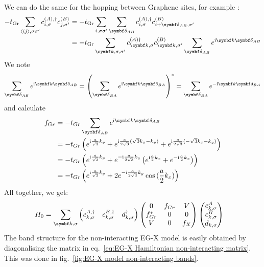 \documentclass[../notes.tex]{subfiles}
\begin{document}
We can do the same for the hopping between Graphene sites, for example :
\begin{align}
	-t_{\mathrm{Gr}} \sum_{\langle ij \rangle, \sigma \sigma^{\prime}} c_{i, \sigma}^{(A), \dagger} c_{j, \sigma^{\prime}}^{(B)}
	&= -t_{\mathrm{Gr}} \sum_{i, \sigma \sigma^{\prime}} \sum_{\vb{\delta}_{AB}} c_{i, \sigma}^{(A), \dagger} c_{i + \vb{\delta}_{AB} , \sigma^{\prime}}^{(B)} \\
	&= -t_{\mathrm{Gr}} \sum_{\vb{k}, \sigma, \sigma^{\prime}}  c_{\vb{k}, \sigma}^{(A) \dagger} c_{\vb{k}, \sigma^{\prime}}^{(B)} \sum_{\vb{\delta}_{AB}} e^{\iu \vb{k} \vb{\delta}_{AB}}
\end{align}
We note
\begin{align}
	\sum_{\vb{\delta}_{AB}} e^{\iu \vb{k} \vb{\delta}_{AB}} = \left( \sum_{\vb{\delta}_{BA}} e^{\iu \vb{k} \vb{\delta}_{BA}} \right)^* = \sum_{\vb{\delta}_{BA}} e^{-\iu \vb{k} \vb{\delta}_{BA}}
\end{align}
and calculate
\begin{align}
	f_{Gr} &= -t_{Gr} \sum_{\vb{\delta}_{AB}} e^{\iu \vb{k} \vb{\delta}_{AB}} \\
	&= -t_{Gr} \left(
	e^{\iu \frac{a}{\sqrt{3}} k_y} +
	e^{\iu \frac{a}{2\sqrt{3}} (\sqrt{3} k_x - k_y)} +
	e^{\iu \frac{a}{2\sqrt{3}} (-\sqrt{3} k_x - k_y)} \right) \\
	&= -t_{Gr} \left(
	e^{\iu \frac{a}{\sqrt{3}} k_y} +
	e^{-\iu \frac{a}{2\sqrt{3}} k_y} \left(
	e^{\iu \frac{a}{2} k_x} + e^{-\iu \frac{a}{2} k_x}
	\right) \right) \\
	&= -t_{Gr} \left(
	e^{\iu \frac{a}{\sqrt{3}} k_y} +
	2 e^{-\iu \frac{a}{2\sqrt{3}} k_y}
	\cos{(\frac{a}{2} k_x)} \right)
\end{align}
All together, we get:
\begin{align}
	H_0 &= \sum_{\vb{k}, \sigma} \begin{pmatrix} c_{k, \sigma}^{A, \dagger} & c_{k, \sigma}^{B, \dagger} & d_{k, \sigma}^{\dagger} \end{pmatrix}
	\begin{pmatrix}
		0 & f_{Gr} & V \\
		f_{Gr}^* & 0 & 0 \\
		V & 0 & f_{X}
	\end{pmatrix} \begin{pmatrix} c_{k, \sigma}^{A} \\ c_{k, \sigma}^{B} \\ d_{k, \sigma} \end{pmatrix}
	\label{eq:EG-X Hamiltonian non-interacting matrix}
\end{align}
The band structure for the non-interacting EG-X model is easily obtained by diagonalising the matrix in eq.~\ref{eq:EG-X Hamiltonian non-interacting matrix}.
This was done in fig.~\ref{fig:EG-X model non-interacting bands}.
\end{document}
